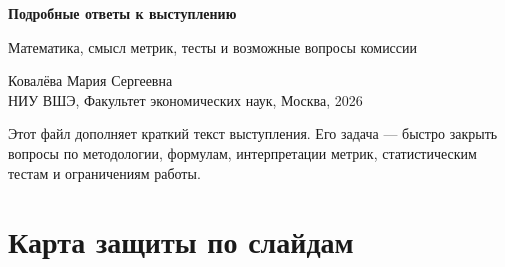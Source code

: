 \documentclass[11pt,a4paper]{article}
\begin{document}
\begin{center}
{\Large\bfseries Подробные ответы к выступлению\par}
\vspace{0.35em}
{\large Математика, смысл метрик, тесты и возможные вопросы комиссии\par}
\vspace{0.45em}
Ковалёва Мария Сергеевна \\
НИУ ВШЭ, Факультет экономических наук, Москва, 2026
\end{center}

\vspace{0.5em}
Этот файл дополняет краткий текст выступления. Его задача --- быстро закрыть вопросы по методологии, формулам, интерпретации метрик, статистическим тестам и ограничениям работы.

\tableofcontents
\newpage

\section{Карта защиты по слайдам}
\end{document}
